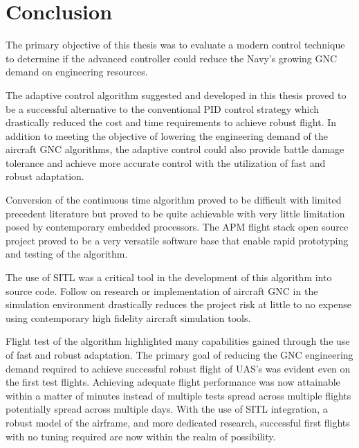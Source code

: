 \chapter{Conclusion}\label{ch:conclusion}

The primary objective of this thesis was to evaluate a modern control technique to determine if the advanced controller could reduce the Navy's growing \ac{GNC} demand on engineering resources.  

The \Lone adaptive control algorithm suggested and developed in this thesis proved to be a successful alternative to the conventional \ac{PID} control strategy which drastically reduced the cost and time requirements to achieve robust flight.  In addition to meeting the objective of lowering the engineering demand of the aircraft \ac{GNC} algorithms, the \Lone adaptive control could also provide battle damage tolerance and achieve more accurate control with the utilization of fast and robust adaptation.

Conversion of the continuous time \Lone algorithm proved to be difficult with limited precedent literature but proved to be quite achievable with very little limitation posed by contemporary embedded processors.  The \ac{APM} flight stack open source project proved to be a very versatile software base that enable rapid prototyping and testing of the \Lone algorithm.  

The use of \ac{SITL} was a critical tool in the development of this algorithm into source code.  Follow on research or implementation of aircraft \ac{GNC} in the simulation environment drastically reduces the project risk at little to no expense using contemporary high fidelity aircraft simulation tools.

Flight test of the \Lone algorithm highlighted many capabilities gained through the use of fast and robust adaptation.  The primary goal of reducing the \ac{GNC} engineering demand required to achieve successful robust flight of \ac{UAS}'s was evident even on the first test flights.  Achieving adequate flight performance was now attainable within a matter of minutes instead of multiple tests spread across multiple flights potentially spread across multiple days.  With the use of \ac{SITL} integration, a robust model of the airframe, and more dedicated research, successful first flights with no tuning required are now within the realm of possibility.




